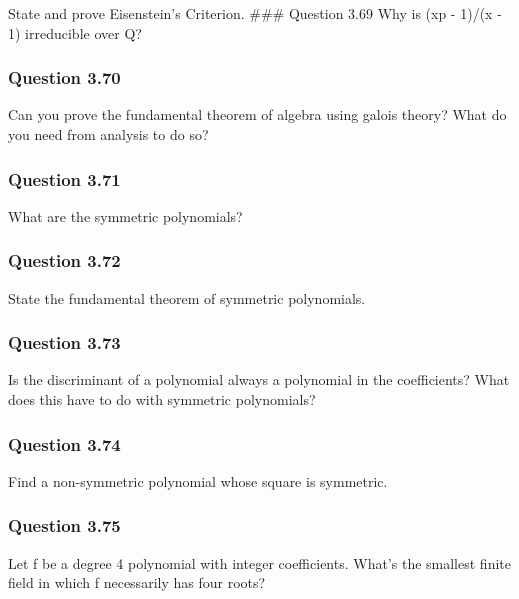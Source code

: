 State and prove Eisenstein's Criterion. \#\#\# Question 3.69 Why is (xp
- 1)/(x - 1) irreducible over Q?

\hypertarget{question-3.70}{%
\subsubsection{Question 3.70}\label{question-3.70}}

Can you prove the fundamental theorem of algebra using galois theory?
What do you need from analysis to do so?

\hypertarget{question-3.71}{%
\subsubsection{Question 3.71}\label{question-3.71}}

What are the symmetric polynomials?

\hypertarget{question-3.72}{%
\subsubsection{Question 3.72}\label{question-3.72}}

State the fundamental theorem of symmetric polynomials.

\hypertarget{question-3.73}{%
\subsubsection{Question 3.73}\label{question-3.73}}

Is the discriminant of a polynomial always a polynomial in the
coefficients? What does this have to do with symmetric polynomials?

\hypertarget{question-3.74}{%
\subsubsection{Question 3.74}\label{question-3.74}}

Find a non-symmetric polynomial whose square is symmetric.

\hypertarget{question-3.75}{%
\subsubsection{Question 3.75}\label{question-3.75}}

Let f be a degree 4 polynomial with integer coefficients. What's the
smallest finite field in which f necessarily has four roots?

